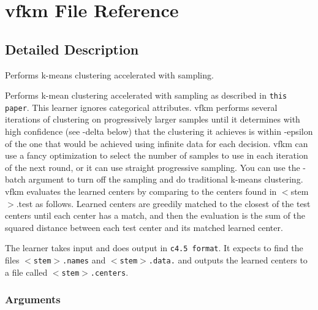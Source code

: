\section{vfkm File Reference}
\label{vfkm}


\subsection{Detailed Description}
Performs k-means clustering accelerated with sampling. 

Performs k-mean clustering accelerated with sampling as described in {\tt this paper}. This learner ignores categorical attributes. vfkm performs several iterations of clustering on progressively larger samples until it determines with high confidence (see -delta below) that the clustering it achieves is within -epsilon of the one that would be achieved using infinite data for each decision. vfkm can use a fancy optimization to select the number of samples to use in each iteration of the next round, or it can use straight progressive sampling. You can use the -batch argument to turn off the sampling and do traditional k-means clustering. vfkm evaluates the learned centers by comparing to the centers found in $<$stem$>$.test as follows. Learned centers are greedily matched to the closest of the test centers until each center has a match, and then the evaluation is the sum of the squared distance between each test center and its matched learned center.

The learner takes input and does output in {\tt c4.5 format}. It expects to find the files {\tt $<$stem$>$.names} and {\tt $<$stem$>$.data.} and outputs the learned centers to a file called {\tt $<$stem$>$.centers}.

\subsubsection*{Arguments}

